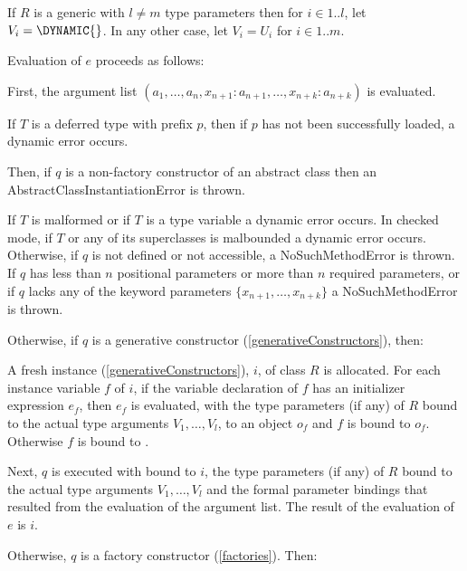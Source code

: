 \documentclass{article}
\newcommand{\code}[1]{{\sf #1}}
\begin{document}
\LMHash{}
If $R$ is a generic with $l \ne m$ type parameters then for $ i \in 1 .. l$, let $V_i =  \DYNAMIC{}$. In any other case, let $V_i = U_i$ for $ i \in 1 .. m$.  

\LMHash{}
Evaluation of $e$ proceeds as follows:

\LMHash{}
First, the argument list $(a_1, \ldots , a_n, x_{n+1}: a_{n+1}, \ldots , x_{n+k}: a_{n+k})$ is evaluated. 

\LMHash{}
If $T$ is a deferred type with prefix $p$, then if $p$ has not been successfully loaded, a dynamic error occurs.

\LMHash{}
Then, if $q$ is a non-factory constructor of an abstract class then an \code{AbstractClassInstantiationError} is thrown.

\LMHash{}
If $T$  is malformed or if $T$ is a type variable a dynamic error occurs. In checked mode, if $T$ or any of its superclasses is malbounded a dynamic error occurs.
 Otherwise, if $q$ is not defined or not accessible, a \code{NoSuchMethodError} is thrown.  If $q$ has  less than $n$ positional parameters or more than $n$ required parameters, or if $q$ lacks any of the keyword parameters $\{ x_{n+1}, \ldots, x_{n+k}\}$ a \code{NoSuchMethodError} is thrown.

\LMHash{}
Otherwise, if $q$ is a generative constructor (\ref{generativeConstructors}), then:


\LMHash{}
A fresh instance (\ref{generativeConstructors}), $i$,  of class $R$ is allocated. For each instance variable $f$ of $i$,  if the variable declaration of $f$ has an initializer expression $e_f$, then $e_f$ is evaluated, with the type parameters (if any) of $R$ bound to the actual type arguments $V_1, \ldots, V_l$, to an object $o_f$ and $f$ is bound to $o_f$. Otherwise $f$ is bound to \NULL{}.


\LMHash{}
Next,  $q$ is executed  with \THIS{} bound to $i$,  the type parameters (if any) of $R$ bound to the actual type arguments $V_1, \ldots, V_l$ and the formal parameter bindings that resulted from the evaluation of the argument list. The result of the evaluation of $e$ is $i$.

\LMHash{}
Otherwise, $q$ is a factory constructor (\ref{factories}). Then:
\end{document}

